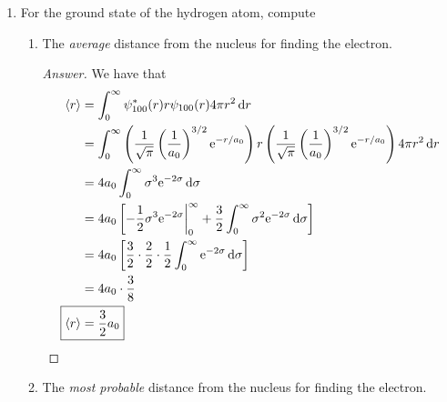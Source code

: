 \documentclass[../psets.tex]{subfiles}
\begin{document}
\begin{enumerate}
\begin{enumerate}
        \item In words, describe the uncertainty in position.
        \begin{proof}[Answer]
            Since the uncertainty in angular momentum is 0, the uncertainty in position (the Fourier transform of the uncertainty in position) is .
        \end{proof}
        \item Using your answers to (a) and (b), explain briefly why the 2D rigid rotor can have a vanishing zero-point energy and yet still remain consistent with the uncertainty relation.
        \begin{proof}[Answer]
            It is consistent with the uncertainty relation because we have total certainty in one term and zero certainty in the other.
        \end{proof}
    \end{enumerate}
    \item For the ground state of the hydrogen atom, compute
    \begin{enumerate}
        \item The \emph{average} distance from the nucleus for finding the electron.
        \begin{proof}[Answer]
            We have that
            \begin{align*}
                \prb{r} &= \int_0^\infty\psi_{100}^*(r)r\psi_{100}(r)4\pi r^2\dd{r}\\
                &= \int_0^\infty\left( \frac{1}{\sqrt{\pi}}\left( \frac{1}{a_0} \right)^{3/2}\e[-r/a_0] \right)r\left( \frac{1}{\sqrt{\pi}}\left( \frac{1}{a_0} \right)^{3/2}\e[-r/a_0] \right)4\pi r^2\dd{r}\\
                &= 4a_0\int_0^\infty\sigma^3\e[-2\sigma]\dd{\sigma}\\
                &= 4a_0\left[ -\frac{1}{2}\sigma^3\e[-2\sigma]\bigg|_0^\infty+\frac{3}{2}\int_0^\infty\sigma^2\e[-2\sigma]\dd{\sigma} \right]\\
                &= 4a_0\left[ \frac{3}{2}\cdot\frac{2}{2}\cdot\frac{1}{2}\int_0^\infty\e[-2\sigma]\dd{\sigma} \right]\\
                &= 4a_0\cdot\frac{3}{8}\\
                \Aboxed{\prb{r} &= \frac{3}{2}a_0}
            \end{align*}
        \end{proof}
        \item The \emph{most probable} distance from the nucleus for finding the electron.

\end{enumerate}
\end{enumerate}
\end{document}
